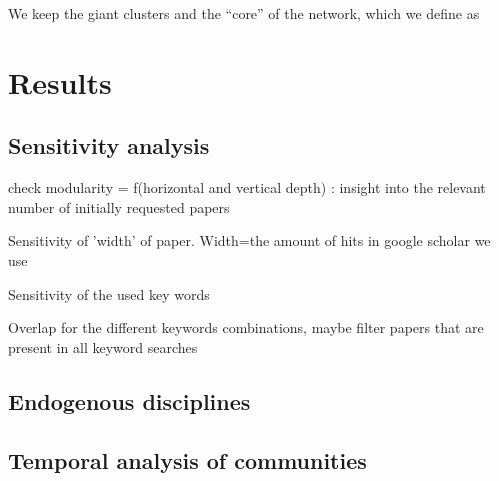 We keep the giant clusters %
and the ``core'' of the network, which we define as


\section*{Results}

\subsection*{Sensitivity analysis}

check modularity = f(horizontal and vertical depth) : insight into the relevant number of initially requested papers

Sensitivity of 'width' of paper. Width=the amount of hits in google scholar we use

Sensitivity of the used key words

Overlap for the different keywords combinations, maybe filter papers that are present in all keyword searches



\subsection*{Endogenous disciplines}










\subsection*{Temporal analysis of communities}

 






